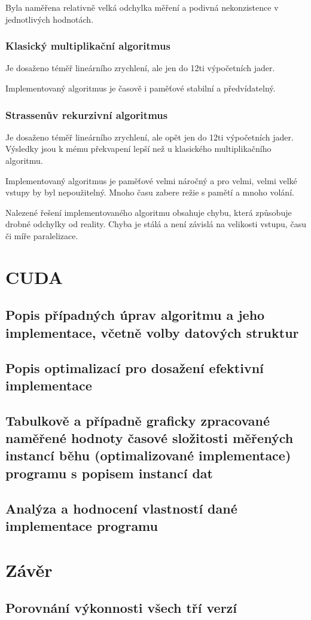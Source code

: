 \documentclass[12pt,a4paper]{article}
\begin{document}
Byla naměřena relativně velká odchylka měření a podivná nekonzistence v jednotlivých hodnotách. 

\subsubsection{Klasický multiplikační algoritmus}

Je dosaženo téměř lineárního zrychlení, ale jen do 12ti výpočetních jader.
\bigskip

Implementovaný algoritmus je časově i paměťové stabilní a předvídatelný.


\subsubsection{Strassenův rekurzivní algoritmus}

Je dosaženo téměř lineárního zrychlení, ale opět jen do 12ti výpočetních jader. Výsledky jsou k mému překvapení lepší než u klasického multiplikačního algoritmu.
\bigskip

Implementovaný algoritmus je paměťové velmi náročný a pro velmi, velmi velké vstupy by byl nepoužitelný. Mnoho času zabere režie s pamětí a mnoho volání.
\bigskip

Nalezené řešení implementovaného algoritmu obsahuje chybu, která způsobuje drobné odchylky od reality. Chyba je stálá a není závislá na velikosti vstupu, času či míře paralelizace.


\section{CUDA}
\subsection{Popis případných úprav algoritmu a jeho implementace, včetně volby datových struktur}
\subsection{Popis optimalizací pro dosažení efektivní implementace}
\subsection{Tabulkově a případně graficky zpracované naměřené hodnoty časové složitosti měřených instancí běhu (optimalizované implementace) programu s popisem instancí dat}
\subsection{Analýza a hodnocení vlastností dané implementace programu}

\section{Závěr}
\subsection{Porovnání výkonnosti všech tří verzí}
\end{document}
